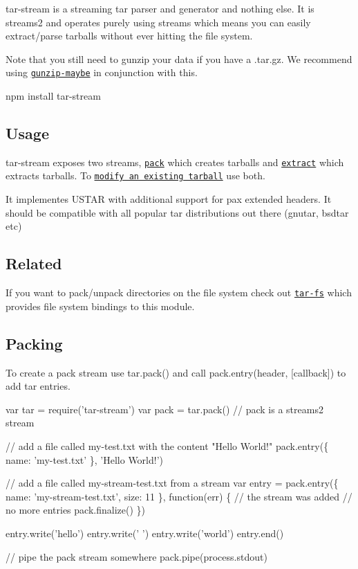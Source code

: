 tar-\/stream is a streaming tar parser and generator and nothing else. It is streams2 and operates purely using streams which means you can easily extract/parse tarballs without ever hitting the file system.

Note that you still need to gunzip your data if you have a {\ttfamily .tar.\+gz}. We recommend using \href{https://github.com/mafintosh/gunzip-maybe}{\tt gunzip-\/maybe} in conjunction with this.


\begin{DoxyCode}
npm install tar-stream
\end{DoxyCode}


\href{http://travis-ci.org/mafintosh/tar-stream}{\tt } \href{http://opensource.org/licenses/MIT}{\tt }

\subsection*{Usage}

tar-\/stream exposes two streams, \href{https://github.com/mafintosh/tar-stream#packing}{\tt pack} which creates tarballs and \href{https://github.com/mafintosh/tar-stream#extracting}{\tt extract} which extracts tarballs. To \href{https://github.com/mafintosh/tar-stream#modifying-existing-tarballs}{\tt modify an existing tarball} use both.

It implementes U\+S\+T\+AR with additional support for pax extended headers. It should be compatible with all popular tar distributions out there (gnutar, bsdtar etc)

\subsection*{Related}

If you want to pack/unpack directories on the file system check out \href{https://github.com/mafintosh/tar-fs}{\tt tar-\/fs} which provides file system bindings to this module.

\subsection*{Packing}

To create a pack stream use {\ttfamily tar.\+pack()} and call {\ttfamily pack.\+entry(header, \mbox{[}callback\mbox{]})} to add tar entries.


\begin{DoxyCode}
var tar = require('tar-stream')
var pack = tar.pack() // pack is a streams2 stream

// add a file called my-test.txt with the content "Hello World!"
pack.entry(\{ name: 'my-test.txt' \}, 'Hello World!')

// add a file called my-stream-test.txt from a stream
var entry = pack.entry(\{ name: 'my-stream-test.txt', size: 11 \}, function(err) \{
  // the stream was added
  // no more entries
  pack.finalize()
\})

entry.write('hello')
entry.write(' ')
entry.write('world')
entry.end()

// pipe the pack stream somewhere
pack.pipe(process.stdout)
\end{DoxyCode}


